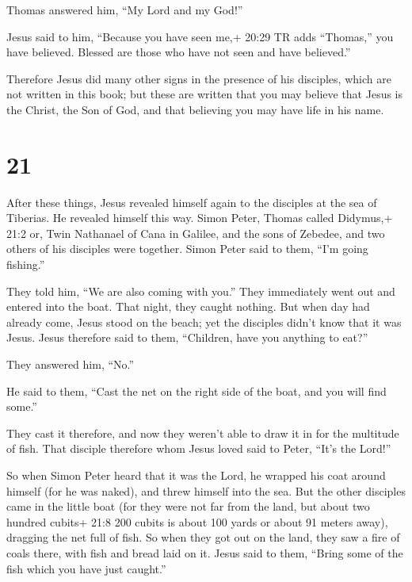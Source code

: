  Thomas answered him, ``My Lord and my God!''

 Jesus said to him, ``Because you have seen me,+ 20:29 TR
adds ``Thomas,'' you have believed. Blessed are those who have not seen
and have believed.''

 Therefore Jesus did many other signs in the presence of
his disciples, which are not written in this book;  but
these are written that you may believe that Jesus is the Christ, the Son
of God, and that believing you may have life in his name.

\hypertarget{section-20}{%
\section{21}\label{section-20}}

 After these things, Jesus revealed himself again to the
disciples at the sea of Tiberias. He revealed himself this way.
 Simon Peter, Thomas called Didymus,+ 21:2 or, Twin
Nathanael of Cana in Galilee, and the sons of Zebedee, and two others of
his disciples were together.  Simon Peter said to them,
``I'm going fishing.''

They told him, ``We are also coming with you.'' They immediately went
out and entered into the boat. That night, they caught nothing.
 But when day had already come, Jesus stood on the beach;
yet the disciples didn't know that it was Jesus.  Jesus
therefore said to them, ``Children, have you anything to eat?''

They answered him, ``No.''

 He said to them, ``Cast the net on the right side of the
boat, and you will find some.''

They cast it therefore, and now they weren't able to draw it in for the
multitude of fish.  That disciple therefore whom Jesus loved
said to Peter, ``It's the Lord!''

So when Simon Peter heard that it was the Lord, he wrapped his coat
around himself (for he was naked), and threw himself into the sea.
 But the other disciples came in the little boat (for they
were not far from the land, but about two hundred cubits+ 21:8 200
cubits is about 100 yards or about 91 meters away), dragging the net
full of fish.  So when they got out on the land, they saw a
fire of coals there, with fish and bread laid on it.  Jesus
said to them, ``Bring some of the fish which you have just caught.''

